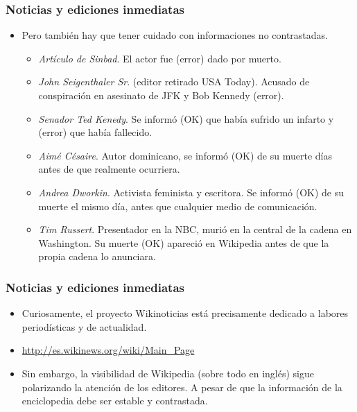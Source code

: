 \begin{frame}
\frametitle{Noticias y ediciones inmediatas}

    \begin{itemize}
      \item Pero también hay que tener cuidado con informaciones no
contrastadas.

      \begin{itemize}
        \item \textit{Artículo de Sinbad}. El actor fue (error) dado por muerto.
	\item \textit{John Seigenthaler Sr}. (editor retirado USA Today). Acusado
de conspiración en asesinato de JFK y Bob Kennedy (error).
	\item \textit{Senador Ted Kenedy}. Se informó (OK) que había sufrido
un infarto y (error) que había fallecido.
	\item \textit{Aimé Césaire}. Autor dominicano, se informó (OK) de su muerte días antes
de que realmente ocurriera.
	\item \textit{Andrea Dworkin}. Activista feminista y escritora. Se informó (OK)
de su muerte el mismo día, antes que cualquier medio de comunicación.
	\item \textit{Tim Russert}. Presentador en la NBC, murió en la central de la cadena en
Washington. Su muerte (OK) apareció en Wikipedia antes de que la propia cadena lo anunciara.
      \end{itemize}

    \end{itemize}

\end{frame}


\begin{frame}
\frametitle{Noticias y ediciones inmediatas}

    \begin{itemize}
      \item Curiosamente, el proyecto Wikinoticias está precisamente dedicado
a labores periodísticas y de actualidad.

      \item \url{http://es.wikinews.org/wiki/Main_Page}

      \item Sin embargo, la visibilidad de Wikipedia (sobre todo en inglés)
sigue polarizando la atención de los editores. A pesar de que la información
de la enciclopedia debe ser estable y contrastada.

    \end{itemize}


\end{frame}

